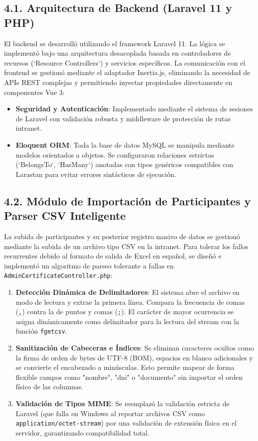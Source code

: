 \documentclass[11pt,a4paper]{article}
\begin{document}
\subsection*{4.1. Arquitectura de Backend (Laravel 11 y PHP)}
El backend se desarrolló utilizando el framework Laravel 11. La lógica se implementó bajo una arquitectura desacoplada basada en controladores de recursos (`Resource Controllers`) y servicios específicos. La comunicación con el frontend se gestionó mediante el adaptador Inertia.js, eliminando la necesidad de APIs REST complejas y permitiendo inyectar propiedades directamente en componentes Vue 3:
\begin{itemize}
    \item \textbf{Seguridad y Autenticación}: Implementado mediante el sistema de sesiones de Laravel con validación robusta y middleware de protección de rutas intranet.
    \item \textbf{Eloquent ORM}: Toda la base de datos MySQL se manipula mediante modelos orientados a objetos. Se configuraron relaciones estrictas (`BelongsTo`, `HasMany`) anotadas con tipos genéricos compatibles con Larastan para evitar errores sintácticos de ejecución.
\end{itemize}

\subsection*{4.2. Módulo de Importación de Participantes y Parser CSV Inteligente}
La subida de participantes y su posterior registro masivo de datos se gestionó mediante la subida de un archivo tipo CSV en la intranet. Para tolerar los fallos recurrentes debido al formato de salida de Excel en español, se diseñó e implementó un algoritmo de parseo tolerante a fallas en \texttt{AdminCertificateController.php}:
\begin{enumerate}
    \item \textbf{Detección Dinámica de Delimitadores}: El sistema abre el archivo en modo de lectura y extrae la primera línea. Compara la frecuencia de comas (\texttt{,}) contra la de puntos y comas (\texttt{;}). El carácter de mayor ocurrencia se asigna dinámicamente como delimitador para la lectura del stream con la función \texttt{fgetcsv}.
    \item \textbf{Sanitización de Cabeceras e Índices}: Se eliminan caracteres ocultos como la firma de orden de bytes de UTF-8 (BOM), espacios en blanco adicionales y se convierte el encabezado a minúsculas. Esto permite mapear de forma flexible campos como "nombre", "dni" o "documento" sin importar el orden físico de las columnas.
    \item \textbf{Validación de Tipos MIME}: Se reemplazó la validación estricta de Laravel (que falla en Windows al reportar archivos CSV como \texttt{application/octet-stream}) por una validación de extensión física en el servidor, garantizando compatibilidad total.
\end{enumerate}
\end{document}
